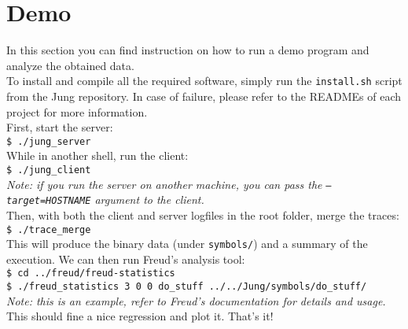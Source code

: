     \section{Demo}

        In this section you can find instruction on how to run a demo program and analyze the obtained data.\\

        To install and compile all the required software, simply run the \texttt{install.sh} script from the Jung repository.
        In case of failure, please refer to the READMEs of each project for more information.\\

        First, start the server:\\

        \texttt{\$ ./jung\_server}\\
        
        While in another shell, run the client:\\
        
        \texttt{\$ ./jung\_client}\\

        \textit{Note: if you run the server on another machine, you can pass the \texttt{---target=HOSTNAME}
        argument to the client.}\\

        Then, with both the client and server logfiles in the root folder, merge the traces:\\

        \texttt{\$ ./trace\_merge}\\

        This will produce the binary data (under \texttt{symbols/}) and a summary of the execution.
        We can then run Freud's analysis tool:\\

        \texttt{\$ cd ../freud/freud-statistics}\\

        \texttt{\$ ./freud\_statistics 3 0 0 do\_stuff ../../Jung/symbols/do\_stuff/}\\
        
        \textit{Note: this is an example, refer to Freud's documentation for details and usage.}\\

        This should fine a nice regression and plot it. That's it!


